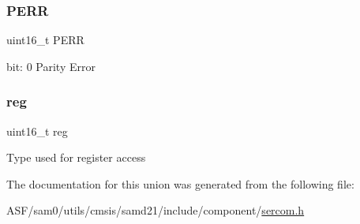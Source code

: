 \subsubsection{\texorpdfstring{PERR}{PERR}}
{\footnotesize\ttfamily uint16\+\_\+t P\+E\+RR}

bit\+: 0 Parity Error \mbox{\label{union_s_e_r_c_o_m___u_s_a_r_t___s_t_a_t_u_s___type_a11760f5020019f4aa8cb02e694f7cc44}} 
\subsubsection{\texorpdfstring{reg}{reg}}
{\footnotesize\ttfamily uint16\+\_\+t reg}

Type used for register access 

The documentation for this union was generated from the following file\+:\begin{DoxyCompactItemize}
\item 
A\+S\+F/sam0/utils/cmsis/samd21/include/component/\mbox{\hyperlink{utils_2cmsis_2samd21_2include_2component_2sercom_8h}{sercom.\+h}}\end{DoxyCompactItemize}
